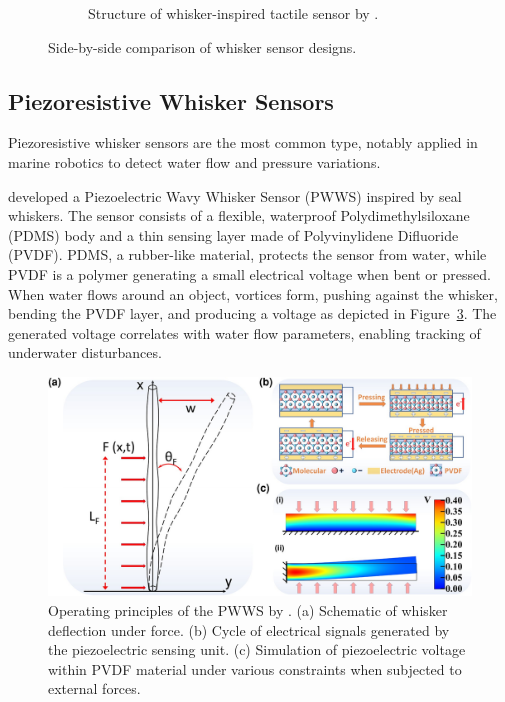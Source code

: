 \begin{figure}[htb]
\begin{subfigure}{0.48\textwidth}
        \caption{Structure of whisker-inspired tactile sensor by \textcite{dang2025whisker}.}
        \label{fig:dang-whisker}
    \end{subfigure}
    \caption{Side-by-side comparison of whisker sensor designs.}
\end{figure}

\subsection{Piezoresistive Whisker Sensors}
Piezoresistive whisker sensors are the most common type, notably applied in marine robotics to detect water flow and pressure variations.

\textcite{GUO2024114875} developed a Piezoelectric Wavy Whisker Sensor (PWWS) inspired by seal whiskers.
The sensor consists of a flexible, waterproof Polydimethylsiloxane (PDMS) body and a thin sensing layer made of Polyvinylidene Difluoride (PVDF).
PDMS, a rubber-like material, protects the sensor from water, while PVDF is a polymer generating a small electrical voltage when bent or pressed.
When water flows around an object, vortices form, pushing against the whisker, bending the PVDF layer, and producing a voltage as depicted in Figure~\ref{fig:piezoelectric-whisker}.
The generated voltage correlates with water flow parameters, enabling tracking of underwater disturbances.

\begin{figure}[htb]
    \centering
    \includegraphics[width=\textwidth]{figures/piezoelectric-whisker}
    \caption{Operating principles of the PWWS by \textcite{GUO2024114875}. (a) Schematic of whisker deflection under force. (b) Cycle of electrical signals generated by the piezoelectric sensing unit. (c) Simulation of piezoelectric voltage within PVDF material under various constraints when subjected to external forces.}
    \label{fig:piezoelectric-whisker}
\end{figure}

